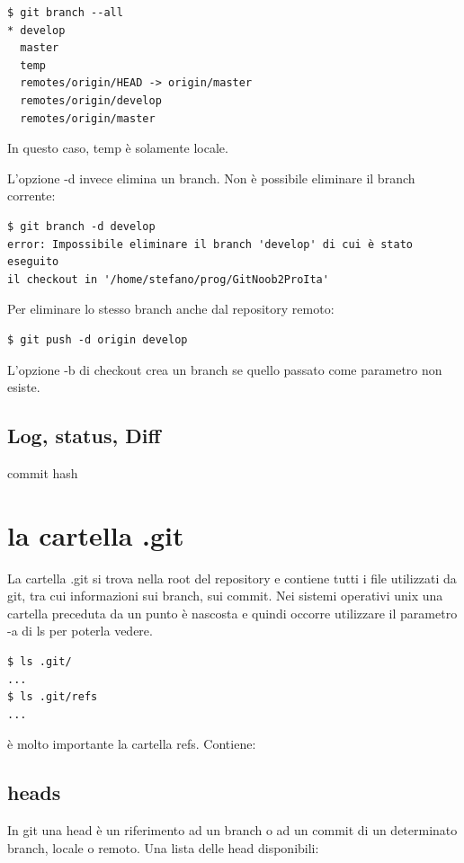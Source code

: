 \documentclass{article} \usepackage[textwidth=18cm,textheight=18cm]{geometry}
\begin{document}
\begin{verbatim}
$ git branch --all
* develop
  master
  temp
  remotes/origin/HEAD -> origin/master
  remotes/origin/develop
  remotes/origin/master
\end{verbatim}

In questo caso, temp è solamente locale.

L'opzione -d invece elimina un branch. Non è possibile eliminare il branch corrente:

\begin{verbatim}
$ git branch -d develop
error: Impossibile eliminare il branch 'develop' di cui è stato eseguito 
il checkout in '/home/stefano/prog/GitNoob2ProIta'
\end{verbatim}

Per eliminare lo stesso branch anche dal repository remoto:

\begin{verbatim}
$ git push -d origin develop
\end{verbatim}

L'opzione -b di checkout crea un branch se quello passato come parametro non
esiste.

\subsection{Log, status, Diff}

commit hash

\section{la cartella .git}

La cartella .git si trova nella root del repository e contiene tutti i file
utilizzati da git, tra cui informazioni sui branch, sui commit. Nei sistemi
operativi unix una cartella preceduta da un punto è nascosta e quindi occorre
utilizzare il parametro -a di ls per poterla vedere.

\begin{verbatim}
$ ls .git/
...
$ ls .git/refs
...
\end{verbatim}

è molto importante la cartella refs. Contiene:

\subsection{heads}

In git una head è un riferimento ad un branch o ad un commit di un determinato
branch, locale o remoto. Una lista delle head disponibili:
\end{document}
